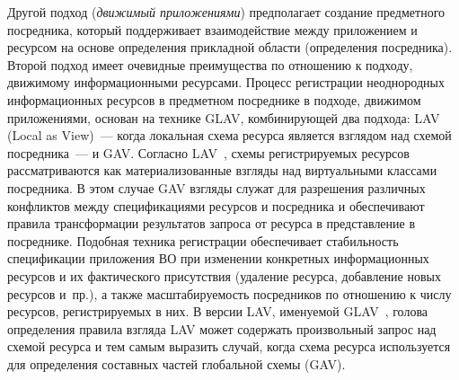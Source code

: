 \begin{multicols}{2}
     Другой подход (\textit{движимый приложениями}) предпо\-ла\-га\-ет создание
предметного посредника, который поддерживает взаимодействие между приложением и
ресурсом на основе определения прикладной области (определения посредника). Второй
подход имеет очевидные преимущества по отно\-ше\-нию к подходу, движимому
информационными ресурсами. Процесс регистрации неоднородных информационных
ресурсов в предметном посреднике в подходе, движимом приложениями, основан на
технике GLAV, ком\-би\-ни\-ру\-ющей два подхода: LAV (Local as View)~--- когда
локальная схема ресурса является взглядом над схемой посредника~--- и GAV. Согласно
LAV~\cite{Hal01}, схемы регистрируемых ресурсов рассматриваются как
матери\-а\-ли\-зо\-ван\-ные взгляды над виртуальными клас\-сами посредника. В этом случае GAV
взгляды служат для разрешения различных конфликтов между спецификациями ресурсов
и посредника и обеспечивают правила трансформации результатов запроса от ресур\-са в
представление в посреднике. Подоб\-ная техника регистрации обеспечивает стабильность
спецификации приложения ВО при изменении конкретных информационных ресурсов и
их фактического присутствия (удаление ресурса, добавление новых ресурсов и~пр.), а
также масштабируемость посредников по отношению к числу ресурсов, регистрируемых в
них. В версии LAV, именуемой GLAV~\cite{Fri99}, голова определения правила взгляда
LAV может содержать произвольный запрос над схемой ресурса и тем самым выразить
случай, когда схема ресурса используется для определения составных частей глобальной
схемы (GAV).


\end{multicols}
